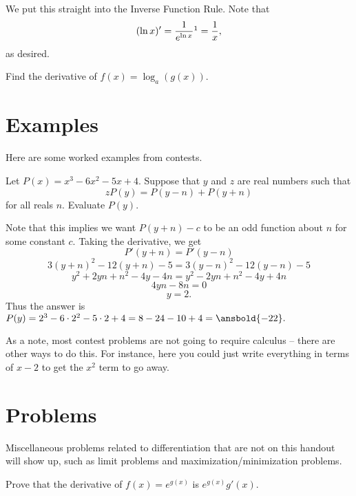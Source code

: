 \documentclass{article}
\begin{document}
\begin{pro}
We put this straight into the Inverse Function Rule. Note that
\[(\ln x)'=\frac{1}{e^{\ln x}}\footnote{Remember that the derivative of $e^x$ is itself.}=\frac{1}{x},\]
as desired.
\end{pro}

\begin{exer}
Find the derivative of $f(x)=\log_a(g(x)).$
\end{exer}

\section{Examples}

Here are some worked examples from contests.

\begin{exam}[CHMMC 2021/4]
Let $P(x)=x^3-6x^2-5x+4.$ Suppose that $y$ and $z$ are real numbers such that
\[zP(y)=P(y-n)+P(y+n)\]
for all reals $n.$ Evaluate $P(y).$
\end{exam}

\begin{sol}
Note that this implies we want $P(y+n)-c$ to be an odd function about $n$ for some constant $c.$ Taking the derivative, we get
\[P'(y+n)=P'(y-n)\]
\[3(y+n)^2-12(y+n)-5=3(y-n)^2-12(y-n)-5\]
\[y^2+2yn+n^2-4y-4n=y^2-2yn+n^2-4y+4n\]
\[4yn-8n=0\]
\[y=2.\]
Thus the answer is $P(y)=2^3-6\cdot 2^2-5\cdot 2+4=8-24-10+4=\ansbold{-22}.$
\end{sol}

As a note, most contest problems are not going to require calculus -- there are other ways to do this. For instance, here you could just write everything in terms of $x-2$ to get the $x^2$ term to go away.

\pagebreak

\section{Problems}

Miscellaneous problems related to differentiation that are not on this handout will show up, such as limit problems and maximization/minimization problems.
\\

\noindent{}


\begin{req}{2}
Prove that the derivative of $f(x)=e^{g(x)}$ is $e^{g(x)}g'(x).$
\end{req}
\end{document}
